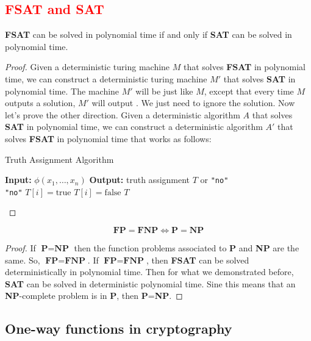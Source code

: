 \newpage
\subsection{\textcolor{red}{FSAT and SAT}}
\begin{defbox}[\textcolor{red}{Proposition (Relation between FSAT and SAT)}]
    \textbf{FSAT} can be solved in polynomial time if and only if \textbf{SAT} can be solved in polynomial time.
\end{defbox}
\begin{proof}
Given a deterministic turing machine $M$ that solves \textbf{FSAT} in polynomial time, we can construct a deterministic turing machine $M'$ that solves \textbf{SAT} in polynomial time. The machine $M'$ will be just like $M$, except that every time $M$ outputs a solution, $M'$ will output . We just need to ignore the solution. Now let's prove the other direction. Given a deterministic algorithm $A$ that solves \textbf{SAT} in polynomial time, we can construct a deterministic algorithm $A'$ that solves \textbf{FSAT} in polynomial time that works as follows:

\begin{algorithm}
\caption{Truth Assignment Algorithm}
\begin{algorithmic}[1]
\State \textbf{Input:} $\phi(x_1, \ldots, x_n)$
\State \textbf{Output:} truth assignment $T$ or \texttt{"no"}
\\
    \State \Return \texttt{"no"}
\EndIf
{}
        \State $T[i] = \text{true}$
    \Else
        \State $T[i] = \text{false}$
    \EndIf
\EndFor
\State \Return $T$
\end{algorithmic}
\end{algorithm}
\end{proof}
\begin{defbox}[Theorem]
    $$\textbf{FP}=\textbf{FNP} \iff \textbf{P}=\textbf{NP}$$
\end{defbox}
\begin{proof}
    If $\textbf{P}=\textbf{NP}$ then the function problems associated to \textbf{P} and \textbf{NP} are the same. So, $\textbf{FP}=\textbf{FNP}$.
    If $\textbf{FP}=\textbf{FNP}$, then \textbf{FSAT} can be solved deterministically in polynomial time. Then for what we demonstrated before, \textbf{SAT} can be solved in deterministic polynomial time. Sine this means that an \textbf{NP}-complete problem is in \textbf{P}, then \textbf{P}=\textbf{NP}. 
\end{proof}

\newpage
\subsection{One-way functions in cryptography}

